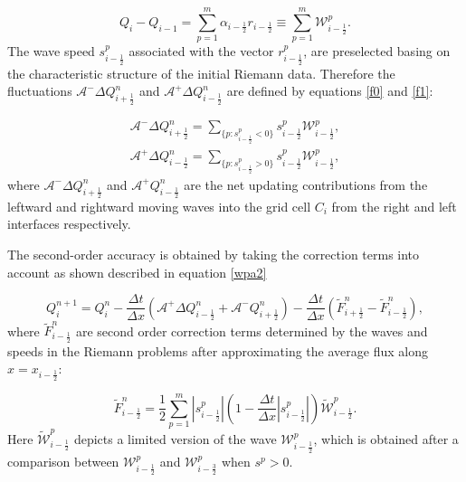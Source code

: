 \documentclass[10pt,a4paper]{article}
\begin{document}
	\begin{equation}
		Q_{i} -  Q_{i-1} = \sum_{p=1}^{m}  \alpha_{i-\frac{1}{2}} r_{i-\frac{1}{2}} \equiv \sum_{p=1}^{m} \mathcal{W}_{i-\frac{1}{2}}^{p}.
		\label{wpa19}
	\end{equation}
	The wave speed $s_{i-\frac{1}{2}}^{p}$ associated with the vector $r_{i-\frac{1}{2}}^{p}$, are preselected basing on the characteristic structure of the initial Riemann data. Therefore the fluctuations $\mathcal{A^{-}}\Delta Q_{i+\frac{1}{2}}^{n}$  and $\mathcal{A^{+}}\Delta Q_{i-\frac{1}{2}}^{n} $ are defined by equations \eqref{f0} and \eqref{f1}:
	
	\begin{eqnarray}
		\mathcal{A^{-}}\Delta Q_{i+\frac{1}{2}}^{n} = \sum_{\{ p:s_{i-\frac{1}{2}}^{p}<0\}} s_{i-\frac{1}{2}}^{p} \mathcal{W}_{i-\frac{1}{2}}^{p},
		\label{f0}\\
		\mathcal{A^{+}}\Delta Q_{i-\frac{1}{2}}^{n} =\sum_{\{ p:s_{i-\frac{1}{2}}^{p}>0\}} s_{i-\frac{1}{2}}^{p} \mathcal{W}_{i-\frac{1}{2}}^{p},
		\label{f1}
	\end{eqnarray}
	where  $\mathcal{A^{-}}\Delta 	Q_{i+\frac{1}{2}}^{n}$ and  $\mathcal{A^{+}}Q_{i-\frac{1}{2}}^{n}$ are the net updating contributions from the  leftward and rightward moving waves into the grid cell $C_{i}$  from the right and left interfaces respectively.
	
	The second-order accuracy is obtained by taking the correction terms into account as shown described in equation \eqref{wpa2} 
	
	\begin{equation}
		Q_{i}^{n+1} =  Q_{i}^{n} - \frac{\Delta t}{\Delta x}(\mathcal{A^{+}}\Delta 	Q_{i-\frac{1}{2}}^{n} + \mathcal{A^{-}}Q_{i+\frac{1}{2}}^{n}) -  \frac{\Delta t}{\Delta x} (\tilde{F}_{i+\frac{1}{2}}^{n} - \tilde{F}_{i-\frac{1}{2}}^{n}),
		\label{wpa2}
	\end{equation}
	where $\tilde{F}_{i-\frac{1}{2}}^{n} $ are second order correction terms determined by the waves and speeds in the Riemann problems after approximating the average flux along  $x = x_{i - \frac{1}{2}}$:
	
	\begin{equation}
		\tilde{F}_{i-\frac{1}{2}}^{n} = \frac{1}{2} \sum_{p=1}^{m}  |s_{i- \frac{1}{2}}^{p}| \left( 1 - \frac{\Delta t}{\Delta x} |s_{i- \frac{1}{2}}^{p}|\right) \tilde{\mathcal{W}}_{i-\frac{1}{2}}^{p}.
		\label{wpa13}
	\end{equation}
	Here $\tilde{\mathcal{W}}_{i-\frac{1}{2}}^{p} $ depicts a limited version of the wave $\mathcal{W}_{i-\frac{1}{2}}^{p} $, which is obtained after a comparison between $\mathcal{W}_{i-\frac{1}{2}}^{p} $ and $\mathcal{W}_{i-\frac{3}{2}}^{p} $ when $s^{p} >0$.
	
\end{document}
